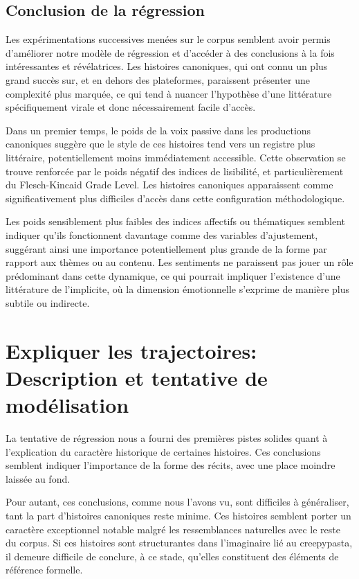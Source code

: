 \documentclass[12pt,a4paper,oneside,titlepage]{book} %
\begin{document}
\subsection{Conclusion de la régression}

Les expérimentations successives menées sur le corpus semblent avoir permis d'améliorer notre modèle de régression et d'accéder à des conclusions à la fois intéressantes et révélatrices. Les histoires canoniques, qui ont connu un plus grand succès sur, et en dehors des plateformes, paraissent présenter une complexité plus marquée, ce qui tend à nuancer l'hypothèse d'une littérature spécifiquement virale et donc nécessairement facile d'accès.

Dans un premier temps, le poids de la voix passive dans les productions canoniques suggère que le style de ces histoires tend vers un registre plus littéraire, potentiellement moins immédiatement accessible. Cette observation se trouve renforcée par le poids négatif des indices de lisibilité, et particulièrement du Flesch-Kincaid Grade Level. Les histoires canoniques apparaissent comme significativement plus difficiles d'accès dans cette configuration méthodologique.

Les poids sensiblement plus faibles des indices affectifs ou thématiques semblent indiquer qu'ils fonctionnent davantage comme des variables d'ajustement, suggérant ainsi une importance potentiellement plus grande de la forme par rapport aux thèmes ou au contenu. Les sentiments ne paraissent pas jouer un rôle prédominant dans cette dynamique, ce qui pourrait impliquer l'existence d'une littérature de l'implicite, où la dimension émotionnelle s'exprime de manière plus subtile ou indirecte.



\section{Expliquer les trajectoires:  Description et tentative de modélisation}
La tentative de régression nous a fourni des premières pistes solides quant à l'explication du caractère historique de certaines histoires. Ces conclusions semblent indiquer l'importance de la forme des récits, avec une place moindre laissée au fond.

Pour autant, ces conclusions, comme nous l'avons vu, sont difficiles à généraliser, tant la part d'histoires canoniques reste minime. Ces histoires semblent porter un caractère exceptionnel notable malgré les ressemblances naturelles avec le reste du corpus. Si ces histoires sont structurantes dans l'imaginaire lié au creepypasta, il demeure difficile de conclure, à ce stade, qu'elles constituent des éléments de référence formelle.
\end{document}
